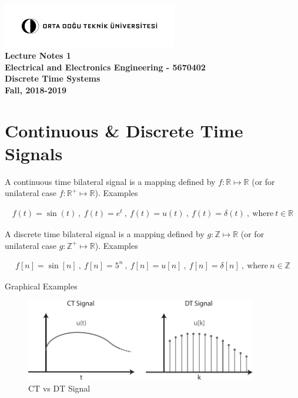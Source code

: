 \documentclass[12pt,oneside]{amsart}
\begin{document}
\begin{center}
  \bf
  \includegraphics[width=3in]{metu_logo} \\
Lecture Notes 1\\
 Electrical and Electronics Engineering - 5670402 \\ 
 Discrete Time Systems \\
 Fall, 2018-2019 
\end{center}

\vspace{12pt}

\section{Continuous \& Discrete Time Signals} 

\vspace{12pt}

A continuous time bilateral signal is a mapping defined by $f:
\mathbb{R} \mapsto \mathbb{R}$ (or for unilateral case $f:
\mathbb{R}^+ \mapsto \mathbb{R}$). Examples

\begin{align*}
  f(t) = \sin (t) \ , \
  f(t) = e^t \ , \
  f(t) = u(t) \ , \
  f(t) = \delta(t) \ , \ \mathrm{where} \ t \in \mathbb{R}
\end{align*}

\vspace{6pt}

A discrete time bilateral signal is a mapping defined by $g:
\mathbb{Z} \mapsto \mathbb{R}$ (or for unilateral case $g:
\mathbb{Z}^+ \mapsto \mathbb{R}$). Examples

\begin{align*}
  f[n] = \sin [n] \ , \
  f[n] = 5^n \ , \
  f[n] = u[n] \ , \
  f[n] = \delta[n] \ , \ \mathrm{where} \ n \in \mathbb{Z}
\end{align*}

\vspace{6pt}

Graphical Examples

\begin{figure}[h]
    \centering
      \includegraphics[width=0.9\textwidth]{signals}
    \caption{CT vs DT Signal}
\end{figure}
\end{document}

